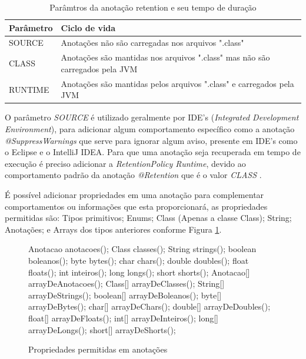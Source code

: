 \begin{table}[H]
    \centering
    \begin{tabular}{|l|l|} \hline
        Parâmetro & Ciclo de vida\\ \hline
        SOURCE    & Anotações não são carregadas nos arquivos ".class"\\ \hline
        CLASS     & Anotações são mantidas nos arquivos ".class" mas não são carregados pela JVM\\ \hline
        RUNTIME   & Anotações são mantidas pelos arquivos ".class" e carregados pela JVM \\ \hline
    \end{tabular}
    \caption{Parâmtros da anotação retention e seu tempo de duração}
    \label{tab:retentions}
\end{table}

\par O parâmetro \textit{SOURCE} é utilizado geralmente por IDE's (\textit{Integrated Development Environment}), para adicionar algum comportamento específico como a anotação \textit{@SuppressWarnings} que serve para ignorar algum aviso, presente em IDE's como o Eclipse e o IntelliJ IDEA. Para que uma anotação seja recuperada em tempo de execução é preciso adicionar a \textit{RetentionPolicy Runtime}, devido ao comportamento padrão da anotação \textit{@Retention} que é o valor \textit{CLASS} \cite{joy2000java}.

\par É possível adicionar propriedades em uma anotação para complementar comportamentos ou informações que esta proporcionará, as propriedades permitidas são: Tipos primitivos; Enums; Class (Apenas a classe Class); String; Anotações; e Arrays dos tipos anteriores conforme Figura \ref{fig:propriedades-anotacoes}.

\begin{figure}[H]
    \centering
    \begin{java}
Anotacao anotacoes();
Class classes();
String strings();
boolean boleanos();
byte bytes();
char chars();
double doubles();
float floats();
int inteiros();
long longs();	
short shorts();
Anotacao[] arrayDeAnotacoes();
Class[] arrayDeClasses();
String[] arrayDeStrings();
boolean[] arrayDeBoleanos();
byte[] arrayDeBytes();
char[] arrayDeChars();
double[] arrayDeDoubles();
float[] arrayDeFloats();
int[] arrayDeInteiros();
long[] arrayDeLongs();	
short[] arrayDeShorts();
    \end{java}
    \caption{Propriedades permitidas em anotações}
    \label{fig:propriedades-anotacoes}
\end{figure}

